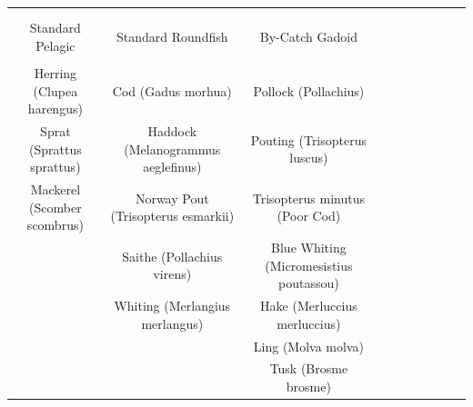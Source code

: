 \documentclass[a4paper 12pt]{article}
\numberwithin{equation}{section}
\begin{document}
\begin{table}[h!]
\centering
\setlength\tabcolsep{1.5pt} 
\begin{tabular}{cccccccccc}
\hline \\[0.1ex]
\multicolumn{2}{c}{} \\[0.1ex]
Standard Pelagic               & Standard Roundfish & By-Catch Gadoid       \\[1.5ex]
\hline \\[0.1ex]
Herring (Clupea harengus) &  Cod (Gadus morhua)  & Pollock (Pollachius)      \\[1.5ex]
Sprat (Sprattus sprattus)   &Haddock (Melanogrammus aeglefinus) & Pouting (Trisopterus luscus) \\[1.5ex]
Mackerel (Scomber scombrus) & Norway Pout (Trisopterus esmarkii) & Trisopterus minutus (Poor Cod) \\[1.5ex]
 & Saithe (Pollachius virens)  & Blue Whiting (Micromesistius poutassou)   \\[1.5ex]
&Whiting (Merlangius merlangus)  & Hake (Merluccius merluccius)  \\[1.5ex]
& &  Ling (Molva molva) \\[1.5ex]
& &  Tusk (Brosme brosme) \\[0.5ex]
\hline
\end{tabular}
\end{table}
\end{document}
